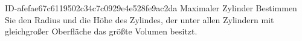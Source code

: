 \begin{exercise}
      {ID-afefae67c6119502c34c7c0929e4e528fe9ac2da}
      {Maximaler Zylinder}
  \ifproblem\problem
    Bestimmen Sie den Radius und die Höhe des Zylindes, der unter allen Zylindern
    mit gleichgroßer Oberfläche das größte Volumen besitzt.
  \fi
\end{exercise}
